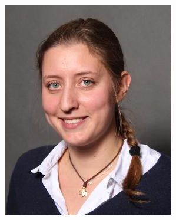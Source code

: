 \documentclass[10pt,a4paper]{scrartcl}
\begin{document}
\thispagestyle{empty} %


\begin{figure}
 \hspace*{-10em}
 \includegraphics[scale=0.3]{img/ceci.jpg}
\end{figure}
\end{document}
